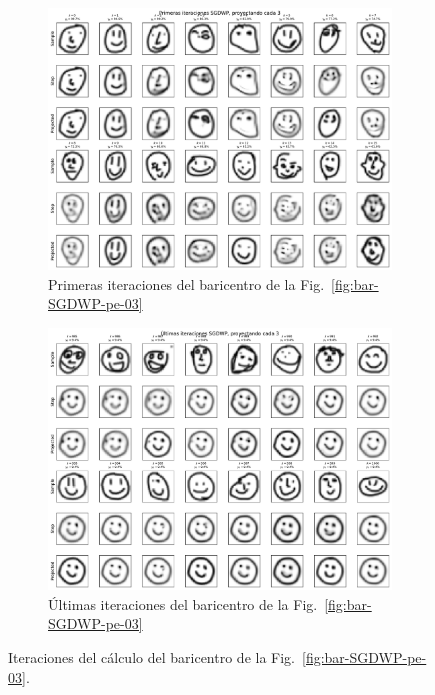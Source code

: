 \begin{figure}[htbp]
    \centering
    \begin{subfigure}[b]{0.8\textwidth}
        \centering
        \includegraphics[width=\textwidth]{img/sgdwp-pe-iters/first-iters-pe-03.pdf}
        \caption{Primeras iteraciones del baricentro de la Fig.~\ref{fig:bar-SGDWP-pe-03}}
        \label{fig:first-iters-pe-03}
    \end{subfigure}
    \begin{subfigure}[b]{0.8\textwidth}
        \centering
        \includegraphics[width=\textwidth]{img/sgdwp-pe-iters/last-iters-pe-03.pdf}
        \caption{Últimas iteraciones del baricentro de la Fig.~\ref{fig:bar-SGDWP-pe-03}}
        \label{fig:last-iters-pe-03}
    \end{subfigure}
    \caption{Iteraciones del cálculo del baricentro de la Fig.~\ref{fig:bar-SGDWP-pe-03}.}
    \label{fig:iters-pe-03}
\end{figure}

